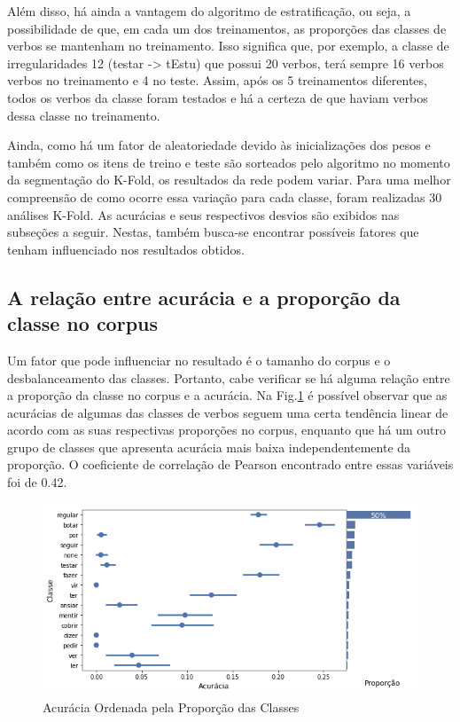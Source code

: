 

Além disso, há ainda a vantagem do algoritmo de estratificação, ou seja, a possibilidade de que, em cada um dos treinamentos, as proporções das classes de verbos se mantenham no treinamento. Isso significa que, por exemplo, a classe de irregularidades 12 (testar -> tEstu) que possui 20 verbos, terá sempre 16 verbos verbos no treinamento e 4 no teste. Assim, após os 5 treinamentos diferentes, todos os verbos da classe foram testados e há a certeza de que haviam verbos dessa classe no treinamento. 

Ainda, como há um fator de aleatoriedade devido às inicializações dos pesos e também como os itens de treino e teste são sorteados pelo algoritmo no momento da segmentação do K-Fold, os resultados da rede podem variar. Para uma melhor compreensão de como ocorre essa variação para cada classe, foram realizadas 30 análises K-Fold. As acurácias e seus respectivos desvios são exibidos nas subseções a seguir. Nestas, também busca-se encontrar possíveis fatores que tenham influenciado nos resultados obtidos.

\subsection{A relação entre acurácia e a proporção da classe no corpus}
\label{sec:prop}
Um fator que pode influenciar no resultado é o tamanho do corpus e o desbalanceamento das classes. Portanto, cabe verificar se há alguma relação entre a proporção da classe no corpus e a acurácia. Na Fig.\ref{fig:kfoldprop} é possível observar que as acurácias de algumas das classes de verbos seguem uma certa tendência linear de acordo com as suas respectivas proporções no corpus, enquanto que há um outro grupo de classes que apresenta acurácia mais baixa independentemente da proporção. O coeficiente de correlação de Pearson encontrado entre essas variáveis foi de 0.42.

\begin{figure}[H]
  \centering
  \includegraphics[width=0.8\linewidth]{img/proporxacc.png}
  \caption{Acurácia Ordenada pela Proporção das Classes}
  \label{fig:kfoldprop}
\end{figure}

